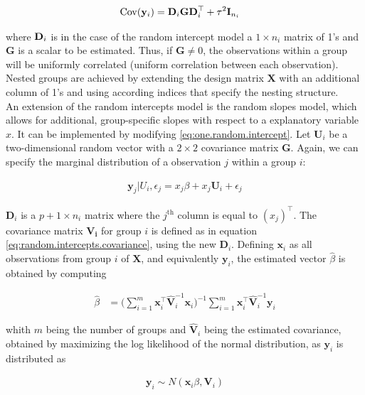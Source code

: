 \documentclass[11pt,a4paper,twoside]{book}\usepackage[]{graphicx}\usepackage[]{color}
\begin{document}
\begin{align}
\operatorname{Cov}(\mathbf{y}_i) &= \mathbf{D}_i \mathbf{G} \mathbf{D}_i^\top + \tau^2 \mathbf{I}_{n_i} \label{eq:random.intercepts.covariance}
\end{align}

where ${\mathbf{D}}_i$ is in the case of the random intercept model a $1 \times n_i$ matrix of 1's and $\mathbf{G}$ is a scalar to be estimated. Thus, if $\mathbf{G} \neq 0$, the observations within a group will be uniformly correlated (uniform correlation between each observation). Nested groups are achieved by extending the design matrix $\mathbf{X}$ with an additional column of 1's and using according indices that specify the nesting structure.\\
An extension of the random intercepts model is the random slopes model, which allows for additional, group-specific slopes with respect to a explanatory variable $x$. It can be implemented by modifying \eqref{eq:one.random.intercept}. Let $\mathbf{U}_i$ be a two-dimensional random vector with a $2 \times 2$ covariance matrix $\mathbf{G}$. Again, we can specify the marginal distribution of a observation $j$ within a group $i$:

\begin{align}
\mathbf{y}_j|U_i,\epsilon_j =  x_j\beta + x_j \mathbf{U}_i + \epsilon_j \label{eq:one.random.intercept.and.slope}
\end{align}

$\mathbf{D}_i$ is a $p + 1 \times n_i$ matrix where the $j^\textrm{th}$ column is equal to $(x_j)^\top$. The covariance matrix $\mathbf{V_i}$ for group $i$ is defined as in equation \eqref{eq:random.intercepts.covariance}, using the new $\mathbf{D}_i$. Defining $\mathbf{x}_i$ as all observations from group $i$ of $\mathbf{X}$, and equivalently $\mathbf{y}_i$, the estimated vector $\hat{\beta}$ is obtained by computing

\begin{align}
\hat{\beta} &= \Big( \sum_{i = 1}^m \mathbf{x}_i^\top \hat{\mathbf{V}}_i^{-1} \mathbf{x}_i \Big)^{-1} \sum_{i = 1}^m \mathbf{x}_i^\top \hat{\mathbf{V}}_i^{-1} \mathbf{y}_i
\end{align}

whith $m$ being the number of groups and $\hat{\mathbf{V}}_i$ being the estimated covariance, obtained by maximizing the log likelihood of the normal distribution, as $\mathbf{y}_i$ is distributed as

\begin{align}
\mathbf{y}_i \sim N(\mathbf{x}_i \beta, \mathbf{V}_i)
\end{align}
\end{document}
